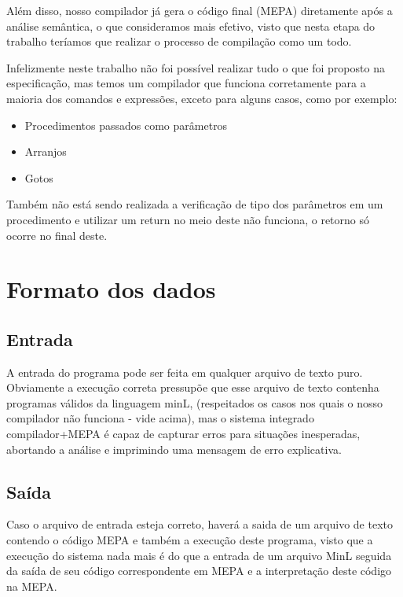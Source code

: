 \documentclass[a4paper,12pt]{article}
\begin{document}
Além disso, nosso compilador já gera o código final (MEPA) diretamente após a análise semântica, o que consideramos mais efetivo, visto que nesta etapa do trabalho teríamos que realizar o processo de compilação como um todo.

Infelizmente neste trabalho não foi possível realizar tudo o que foi proposto na especificação, mas temos um compilador que funciona corretamente para a maioria dos comandos e expressões, exceto para alguns casos, como por exemplo:

\begin{itemize}
 \item Procedimentos passados como parâmetros
 \item Arranjos
 \item Gotos
\end{itemize}

Também não está sendo realizada a verificação de tipo dos parâmetros em um procedimento e utilizar um return no meio deste não funciona, o retorno só ocorre no final deste.

\section{Formato dos dados}
\subsection{Entrada}
A entrada do programa pode ser feita em qualquer arquivo de texto puro. Obviamente a execução correta pressupõe que esse arquivo de texto contenha programas válidos da linguagem minL, (respeitados os casos nos quais o nosso compilador não funciona - vide acima), mas o sistema integrado compilador+MEPA é capaz de capturar erros para situações inesperadas, abortando a análise e imprimindo uma mensagem de erro explicativa.

\subsection{Saída}
Caso o arquivo de entrada esteja correto, haverá a saida de um arquivo de texto contendo o código MEPA e também a execução deste programa, visto que a execução do sistema nada mais é do que a entrada de um arquivo MinL seguida da saída de seu código correspondente em MEPA e a interpretação deste código na MEPA.
\end{document}
